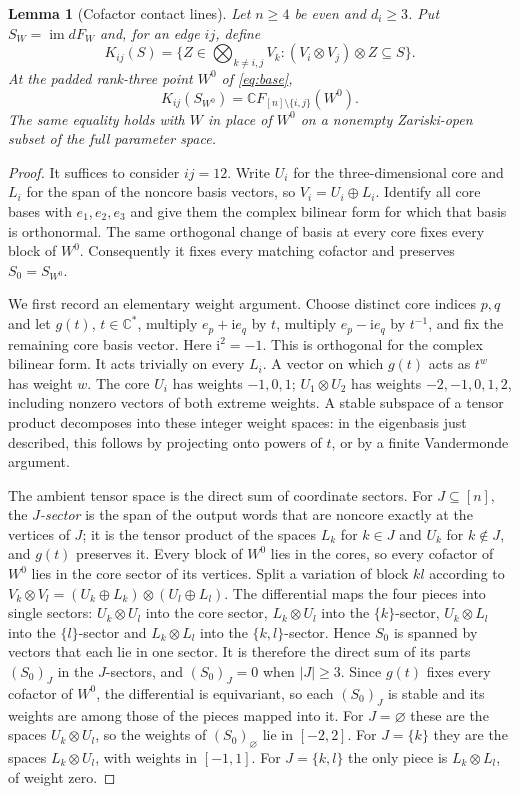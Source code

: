 \documentclass[11pt]{article}
\newtheorem{lemma}[theorem]{Lemma}
\theoremstyle{remark}\newtheorem{remark}[theorem]{Remark}
\newcommand{\C}{\mathbb C}
\begin{document}
\begin{lemma}[Cofactor contact lines]\label{lem:all-order-contact}
Let $n\geq4$ be even and $d_i\geq3$. Put
$S_W=\operatorname{im}dF_W$ and, for an edge $ij$, define
\[
 K_{ij}(S)=\{Z\in\bigotimes_{k\ne i,j}V_k:
                 (V_i\otimes V_j)\otimes Z\subseteq S\}.
\]
At the padded rank-three point $W^0$ of \eqref{eq:base},
\[
 K_{ij}(S_{W^0})=\C F_{[n]\setminus\{i,j\}}(W^0).
\]
The same equality holds with $W$ in place of $W^0$ on a nonempty
Zariski-open subset of the full parameter space.
\end{lemma}
\begin{proof}
It suffices to consider $ij=12$. Write $U_i$ for the three-dimensional
core and $L_i$ for the span of the noncore basis vectors, so
$V_i=U_i\oplus L_i$.
Identify all core bases with $e_1,e_2,e_3$ and give them the complex
bilinear form for which that basis is orthonormal. The same orthogonal
change of basis at every core fixes every block of $W^0$. Consequently
it fixes every matching cofactor and preserves $S_0=S_{W^0}$.

We first record an elementary weight argument. Choose distinct core
indices $p,q$ and let $g(t)$, $t\in\C^*$, multiply $e_p+\mathrm i e_q$
by $t$, multiply $e_p-\mathrm i e_q$ by $t^{-1}$, and fix the remaining
core basis vector. Here $\mathrm i^2=-1$. This is orthogonal for the
complex bilinear form. It acts trivially on every $L_i$. A vector on
which $g(t)$ acts as $t^w$ has weight $w$. The core $U_i$ has weights
$-1,0,1$; $U_1\otimes U_2$ has weights $-2,-1,0,1,2$, including
nonzero vectors of both extreme weights. A stable subspace of a tensor
product decomposes into these integer weight spaces: in the eigenbasis
just described, this follows by projecting onto powers of $t$, or by
a finite Vandermonde argument.

The ambient tensor space is the direct sum of coordinate sectors. For
$J\subseteq[n]$, the \emph{$J$-sector} is the span of the output words
that are noncore exactly at the vertices of $J$; it is the tensor
product of the spaces $L_k$ for $k\in J$ and $U_k$ for $k\notin J$,
and $g(t)$ preserves it. Every block of $W^0$ lies in the cores, so
every cofactor of $W^0$ lies in the core sector of its vertices. Split
a variation of block $kl$ according to
$V_k\otimes V_l=(U_k\oplus L_k)\otimes(U_l\oplus L_l)$. The
differential maps the four pieces into single sectors: $U_k\otimes U_l$
into the core sector, $L_k\otimes U_l$ into the $\{k\}$-sector,
$U_k\otimes L_l$ into the $\{l\}$-sector and $L_k\otimes L_l$ into the
$\{k,l\}$-sector. Hence $S_0$ is spanned by vectors that each lie in
one sector. It is therefore the direct sum of its parts $(S_0)_J$ in
the $J$-sectors, and $(S_0)_J=0$ when $|J|\geq3$. Since $g(t)$ fixes
every cofactor of $W^0$, the differential is equivariant, so each
$(S_0)_J$ is stable and its weights are among those of the pieces
mapped into it. For $J=\varnothing$ these are the spaces
$U_k\otimes U_l$, so the weights of $(S_0)_\varnothing$ lie in
$[-2,2]$. For $J=\{k\}$ they are the spaces $L_k\otimes U_l$, with
weights in $[-1,1]$. For $J=\{k,l\}$ the only piece is
$L_k\otimes L_l$, of weight zero.


\end{proof}
\end{document}
